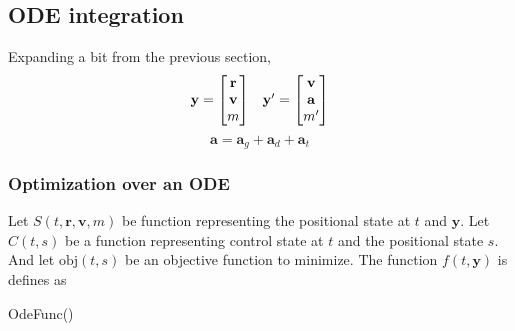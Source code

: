 \subsection{ODE integration}
Expanding a bit from the previous section,
\begin{equation}
    \begin{array}{c c}
        \mathbf{y}=
        \begin{bmatrix}
            \mathbf{r} \\
            \mathbf{v} \\
            m
        \end{bmatrix} &
        \mathbf{y}'=
        \begin{bmatrix}
            \mathbf{v} \\
            \mathbf{a} \\
            m'
        \end{bmatrix}
    \end{array}
\end{equation}
\[
    \mathbf{a}=\mathbf{a}_g+\mathbf{a}_d+\mathbf{a}_t
\]

\subsubsection{Optimization over an ODE}
Let $S\left(t,\mathbf{r}, \mathbf{v}, m\right)$ be function representing the positional state at $t$ and $\mathbf{y}$.
Let $C\left(t,s\right)$ be a function representing control state at $t$ and the positional state $s$.
And let $\mathrm{obj}\left(t,s\right)$ be an objective function to minimize.
The function $f\left(t,\mathbf{y}\right)$ is defines as
\begin{function}
    \DontPrintSemicolon
    \caption{OdeFunc()}
\end{function}

